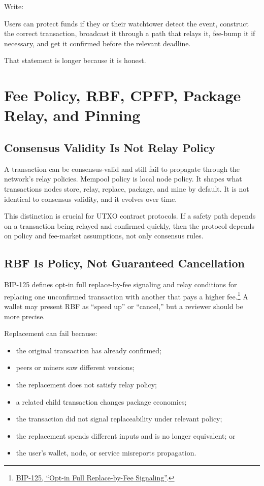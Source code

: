 Write:

\begin{codeblock}
Users can protect funds if they or their watchtower detect the event,
construct the correct transaction, broadcast it through a path that
relays it, fee-bump it if necessary, and get it confirmed before the
relevant deadline.
\end{codeblock}

That statement is longer because it is honest.

\section{Fee Policy, RBF, CPFP, Package Relay, and Pinning}

\subsection{Consensus Validity Is Not Relay Policy}

A transaction can be consensus-valid and still fail to propagate through the network's relay policies. Mempool policy is local node policy. It shapes what transactions nodes store, relay, replace, package, and mine by default. It is not identical to consensus validity, and it evolves over time.

This distinction is crucial for UTXO contract protocols. If a safety path depends on a transaction being relayed and confirmed quickly, then the protocol depends on policy and fee-market assumptions, not only consensus rules.

\subsection{RBF Is Policy, Not Guaranteed Cancellation}

BIP-125 defines opt-in full replace-by-fee signaling and relay conditions for replacing one unconfirmed transaction with another that pays a higher fee.\footnote{\href{https://bips.dev/125/}{BIP-125, ``Opt-in Full Replace-by-Fee Signaling''}.} A wallet may present RBF as ``speed up'' or ``cancel,'' but a reviewer should be more precise.

Replacement can fail because:

\begin{itemize}
\item the original transaction has already confirmed;
\item peers or miners saw different versions;
\item the replacement does not satisfy relay policy;
\item a related child transaction changes package economics;
\item the transaction did not signal replaceability under relevant policy;
\item the replacement spends different inputs and is no longer equivalent; or
\item the user's wallet, node, or service misreports propagation.
\end{itemize}

